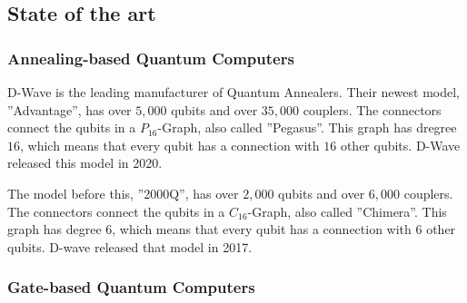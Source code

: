 


\subsection{State of the art}

\subsubsection{Annealing-based Quantum Computers}

D-Wave is the leading manufacturer of Quantum Annealers.
Their newest model, ''Advantage'', has over $5, 000$ qubits and over $35, 000$ couplers.
The connectors connect the qubits in a $P_{16}$-Graph, also called ''Pegasus''.
This graph has dregree $16$, which means that every qubit has a connection with $16$ other qubits.
D-Wave released this model in 2020.
\cite{D-Wave2020, Zbinden2020}

The model before this, ''2000Q'', has over $2, 000$ qubits and over $6, 000$ couplers.
The connectors connect the qubits in a $C_{16}$-Graph, also called ''Chimera''.
This graph has degree $6$, which means that every qubit has a connection with $6$ other qubits.
D-wave released that model in 2017.
\cite{D-Wave2020, Zbinden2020}


\subsubsection{Gate-based Quantum Computers}

